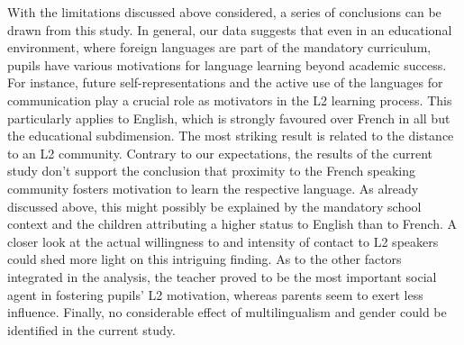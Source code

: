 \documentclass[output=paper]{langsci/langscibook}
\begin{document}
With the limitations discussed above considered, a series of conclusions can be drawn from this study. In general, our data suggests that even in an educational environment, where foreign languages are part of the mandatory curriculum, pupils have various motivations for language learning beyond academic success. For instance, future self-representations and the active use of the languages for communication play a crucial role as motivators in the L2 learning process. This particularly applies to English, which is strongly favoured over French in all but the educational subdimension. The most striking result is related to the distance to an L2 community. Contrary to our expectations, the results of the current study don’t support the conclusion that proximity to the French speaking community fosters motivation to learn the respective language. As already discussed above, this might possibly be explained by the mandatory school context and the children attributing a higher status to English than to French. A closer look at the actual willingness to and intensity of contact to L2 speakers could shed more light on this intriguing finding. As to the other factors integrated in the analysis, the teacher proved to be the most important social agent in fostering pupils’ L2 motivation, whereas parents seem to exert less influence. Finally, no considerable effect of multilingualism and gender could be identified in the current study.


{\sloppy\printbibliography[heading=subbibliography,notkeyword=this]}
\end{document}
